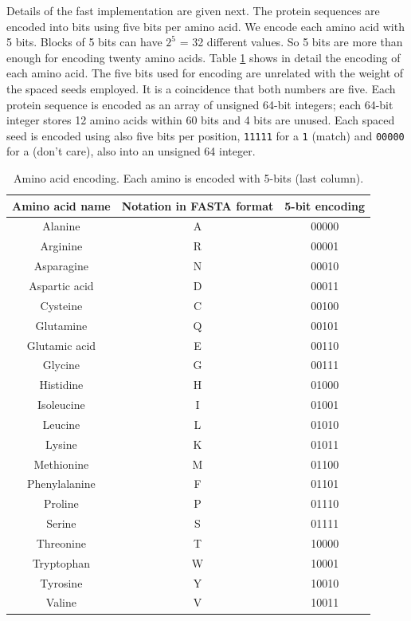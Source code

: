 Details of the fast implementation are given next. The protein sequences are encoded into bits using five bits per amino acid. We encode each amino acid with 5 bits. Blocks of 5 bits can have $2^5$ = 32 different values. So 5 bits are more than enough for encoding twenty amino acids. 
Table \ref{tab_A_A_encoding} shows in detail the encoding of each amino acid. The five bits used for encoding are unrelated with the weight of the spaced seeds employed. It is a coincidence that both numbers are five. Each protein sequence is encoded as an array of unsigned 64-bit integers; each 64-bit integer stores 12 amino acids within 60 bits and 4 bits are unused. Each spaced seed is encoded using also five bits per position, {\tt 11111} for a {\tt 1} (match) and {\tt 00000} for a {\tt *} (don't care), also into an unsigned 64 integer.  

\begin{table}[h!]
\begin{center}
\begin{tabular}[h!]{|c|c|c|} 
\hline
Amino acid name & Notation in FASTA format & 5-bit encoding \\
\hline
Alanine & A & 00000 \\
\hline
Arginine & R & 00001\\
\hline
Asparagine & N & 00010 \\
\hline
Aspartic acid & D & 00011 \\
\hline
Cysteine & C & 00100 \\
\hline
Glutamine & Q & 00101 \\
\hline
Glutamic acid & E & 00110 \\
\hline
Glycine & G & 00111 \\
\hline
Histidine & H & 01000\\
\hline
Isoleucine & I & 01001 \\
\hline
Leucine & L & 01010 \\
\hline
Lysine & K & 01011 \\
\hline
Methionine & M & 01100 \\
\hline
Phenylalanine & F & 01101 \\
\hline
Proline & P & 01110\\
\hline
Serine & S & 01111 \\
\hline
Threonine & T & 10000 \\
\hline
Tryptophan & W & 10001 \\
\hline
Tyrosine & Y & 10010 \\
\hline
Valine & V & 10011 \\
\hline
\end{tabular}
\caption[Amino acid encoding]{Amino acid encoding. Each amino is encoded with 5-bits (last column). \label{tab_A_A_encoding}}
\end{center}
\end{table}

